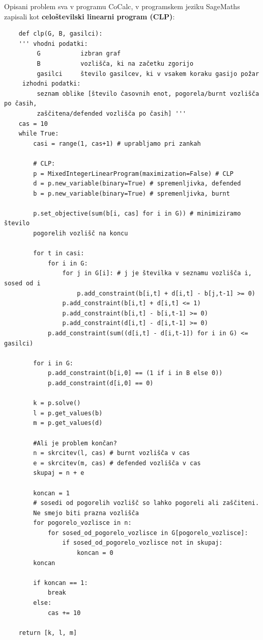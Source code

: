 \documentclass[a4paper, 12pt]{article}
\begin{document}
Opisani problem sva v programu CoCalc, v programskem jeziku SageMaths 
zapisali kot \textbf{celoštevilski linearni program (CLP)}: \\

\overfullrule=0pt
\begin{verbatim}
    def clp(G, B, gasilci):
    ''' vhodni podatki:
         G           izbran graf
         B           vozlišča, ki na začetku zgorijo
         gasilci     število gasilcev, ki v vsakem koraku gasijo požar
     izhodni podatki:
         seznam oblike [število časovnih enot, pogorela/burnt vozlišča po časih, 
         zaščitena/defended vozlišča po časih] '''
    cas = 10
    while True:
        casi = range(1, cas+1) # uprabljamo pri zankah
    
        # CLP:
        p = MixedIntegerLinearProgram(maximization=False) # CLP
        d = p.new_variable(binary=True) # spremenljivka, defended
        b = p.new_variable(binary=True) # spremenljivka, burnt

        p.set_objective(sum(b[i, cas] for i in G)) # minimiziramo število 
        pogorelih vozlišč na koncu 

        for t in casi:
            for i in G:
                for j in G[i]: # j je številka v seznamu vozlišča i, sosed od i
                    p.add_constraint(b[i,t] + d[i,t] - b[j,t-1] >= 0)
                p.add_constraint(b[i,t] + d[i,t] <= 1)
                p.add_constraint(b[i,t] - b[i,t-1] >= 0)
                p.add_constraint(d[i,t] - d[i,t-1] >= 0)
            p.add_constraint(sum((d[i,t] - d[i,t-1]) for i in G) <= gasilci)

        for i in G:
            p.add_constraint(b[i,0] == (1 if i in B else 0))
            p.add_constraint(d[i,0] == 0)
            
        k = p.solve()
        l = p.get_values(b)
        m = p.get_values(d)
        
        #Ali je problem končan?
        n = skrcitev(l, cas) # burnt vozlišča v cas
        e = skrcitev(m, cas) # defended vozlišča v cas
        skupaj = n + e
        
        koncan = 1
        # sosedi od pogorelih vozlišč so lahko pogoreli ali zaščiteni.
        Ne smejo biti prazna vozlišča
        for pogorelo_vozlisce in n:
            for sosed_od_pogorelo_vozlisce in G[pogorelo_vozlisce]:
                if sosed_od_pogorelo_vozlisce not in skupaj:
                    koncan = 0
        koncan
        
        if koncan == 1:
            break
        else:
            cas += 10
        
    return [k, l, m]
\end{verbatim}
\end{document}
